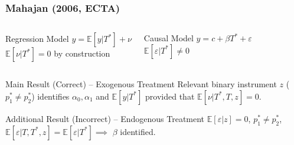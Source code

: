 \documentclass{beamer}
\begin{document}
\begin{frame}
  \frametitle{Mahajan (2006, ECTA)}

  \vspace{-1em}

    \begin{columns}[c]
    \begin{exampleblock}{Regression Model}
      $y = \mathbb{E}[y|T^*] + \nu$\\
      {\small $\mathbb{E}[\nu|T^*]=0$ by construction}
    \end{exampleblock}
    \begin{exampleblock}{Causal Model}
     $y = c + \beta T^* + \varepsilon$\\
     {\small$\mathbb{E}[\varepsilon|T^*]\neq 0$}
    \end{exampleblock}
    \end{columns}

    \vspace{1.5em}
  
  \begin{block}{Main Result (Correct) -- Exogenous Treatment}
   Relevant binary instrument $z$ ($p^*_1 \neq p^*_2$) identifies $\alpha_0, \alpha_1$ and $\mathbb{E}[y|T^*]$ provided that $\mathbb{E}[\nu|T^*,T,z]=0$. 
  \end{block}

  \begin{alertblock}{Additional Result (Incorrect) -- Endogenous Treatment}
    $\mathbb{E}[\varepsilon|z]=0$, $p^*_1 \neq p^*_2$, $\mathbb{E}[\varepsilon|T,T^*,z]=\mathbb{E}[\varepsilon|T^*] \implies$ $\beta$ identified.
  \end{alertblock}
\end{frame}

\end{document}
